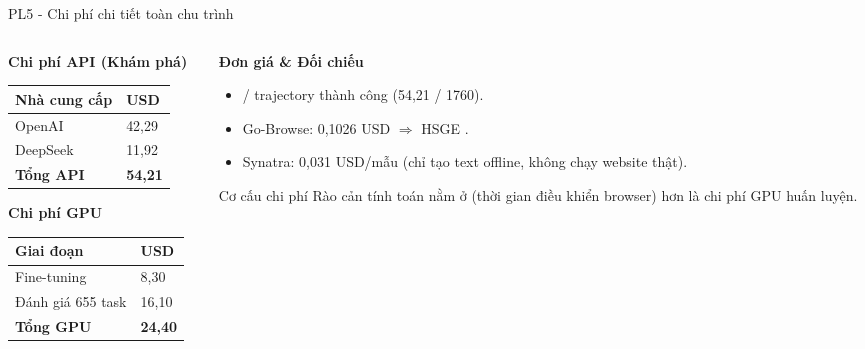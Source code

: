 \begin{frame}{PL5 - Chi phí chi tiết toàn chu trình}
  \begin{columns}[t]
    \begin{column}{0.48\textwidth}
      \textbf{Chi phí API (Khám phá)}
      \vspace{0.04cm}
      \centering
      \setlength{\tabcolsep}{3pt}
      \begin{tabular}{@{}L{2.4cm} R{1.4cm}@{}}
        \toprule
        \textbf{Nhà cung cấp} & \textbf{USD} \\
        \midrule
        OpenAI & 42,29 \\
        DeepSeek & 11,92 \\
        \midrule
        \textbf{Tổng API} & \textbf{54,21} \\
        \bottomrule
      \end{tabular}
      \vspace{0.06cm}

      \raggedright
      \textbf{Chi phí GPU}
      \vspace{0.04cm}
      \centering
      \begin{tabular}{@{}L{2.4cm} R{1.4cm}@{}}
        \toprule
        \textbf{Giai đoạn} & \textbf{USD} \\
        \midrule
        Fine-tuning & 8,30 \\
        Đánh giá 655 task & 16,10 \\
        \midrule
        \textbf{Tổng GPU} & \textbf{24,40} \\
        \bottomrule
      \end{tabular}
    \end{column}
    \hfill
    \begin{column}{0.48\textwidth}
      \textbf{Đơn giá \& Đối chiếu}
      \begin{itemize}\setlength{\itemsep}{3pt}
        \item {} / trajectory thành công (54,21 / 1760).
        \item Go-Browse: 0,1026 USD $\Rightarrow$ HSGE .
        \item Synatra: 0,031 USD/mẫu (chỉ tạo text offline, không chạy website thật).
      \end{itemize}
      \vspace{0.06cm}
      \begin{block}{Cơ cấu chi phí}
        Rào cản tính toán nằm ở  (thời gian điều khiển browser) hơn là chi phí GPU huấn luyện.
      \end{block}
    \end{column}
  \end{columns}
\end{frame}

